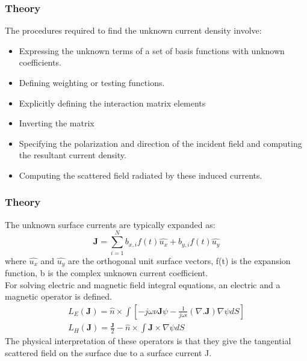 \documentclass{beamer}
\begin{document}
\begin{frame}
\frametitle{Theory}
The procedures required to find the unknown current density involve:
\begin{itemize}
\item Expressing the unknown terms of a set of basis functions with unknown coefficients.
\item Defining weighting or testing functions.
\item Explicitly defining the interaction matrix elements
\item Inverting the matrix
\item Specifying the polarization and direction of the incident field and computing the resultant current density.
\item Computing the scattered field radiated by these induced currents.
\end{itemize}
\end{frame}

\begin{frame}
\frametitle{Theory}
The unknown surface currents are typically expanded as:
\begin{equation}
\textbf{J} = \sum_{i=1}^N b_{x,i}f(t)\hat{u_x} + b_{y,i}f(t)\hat{u_y}
\end{equation}
where $\hat{u_x}$ and $\hat{u_y}$ are the orthogonal unit surface vectors, f(t) is the expansion function, b is the complex unknown current coefficient.\\
For solving electric and magnetic field integral equations, an electric and a magnetic operator is defined. 
\begin{eqnarray}
L_E(\textbf{J}) = \hat{n}\times\int[-j\omega\nu\textbf{J}\psi -\frac{1}{j\omega\epsilon}(\nabla . \textbf{J}) \nabla \psi dS]\\
L_H(\textbf{J}) = \frac{\textbf{J}}{2} - \hat{n} \times \int \textbf{J} \times \nabla \psi dS
\end{eqnarray}
The physical interpretation of these operators is that they give the tangential scattered field on the surface due to a surface current J.
\end{frame}
\end{document}
